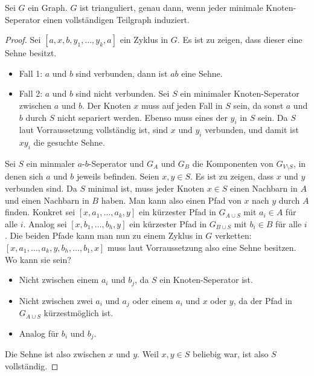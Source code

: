 \documentclass[../main.tex]{subfiles}
\begin{document}
\begin{satz}\label{thm:triangulated--completeSeperator}
    Sei $G$ ein Graph. $G$ ist trianguliert, genau dann, wenn jeder minimale Knoten-Seperator einen vollständigen Teilgraph induziert.
\end{satz}
\begin{proof}
    \say{$\Leftarrow$} Sei $[a, x, b, y_1, \hdots, y_k, a]$ ein Zyklus in $G$. Es ist zu zeigen, dass dieser eine Sehne besitzt.
    \begin{itemize}
        \item Fall 1: $a$ und $b$ sind verbunden, dann ist $ab$ eine Sehne.
        \item Fall 2: $a$ und $b$ sind nicht verbunden. Sei $S$ ein minimaler Knoten-Seperator zwischen $a$ und $b$. Der Knoten $x$ muss auf jeden Fall in $S$ sein, da sonst $a$ und $b$ durch $S$ nicht separiert werden. Ebenso muss eines der $y_i$ in $S$ sein. Da $S$ laut Vorraussetzung vollständig ist, sind $x$ und $y_i$ verbunden, und damit ist $xy_i$ die gesuchte Sehne.

    \end{itemize}

    \say{$\Rightarrow$} Sei $S$ ein minmaler $a$-$b$-Seperator und $G_A$ und $G_B$ die Komponenten von $G_{V \setminus S}$, in denen sich $a$ und $b$ jeweils befinden. Seien $x, y \in S$. Es ist zu zeigen, dass $x$ und $y$ verbunden sind. Da $S$ minimal ist, muss jeder Knoten $x \in S$ einen Nachbarn in $A$ und einen Nachbarn in $B$ haben. Man kann also einen Pfad von $x$ nach $y$ durch $A$ finden. Konkret sei $[x, a_1, \hdots, a_k, y]$ ein kürzester Pfad in $G_{A \cup S}$ mit $a_i \in A$ für alle $i$. Analog sei $[x, b_1, \hdots, b_h, y]$ ein kürzester Pfad in $G_{B \cup S}$ mit $b_i \in B$ für alle $i$. Die beiden Pfade kann man nun zu einem Zyklus in $G$ verketten: $[x, a_1, \hdots, a_k, y, b_h, \hdots, b_1, x]$ muss laut Vorraussetzung also eine Sehne besitzen. Wo kann sie sein?

    \begin{itemize}
        \item Nicht zwischen einem $a_i$ und $b_j$, da $S$ ein Knoten-Seperator ist.
        \item Nicht zwischen zwei $a_i$ und $a_j$ oder einem $a_i$ und $x$ oder $y$, da der Pfad in $G_{A \cup S}$ kürzestmöglich ist.
        \item Analog für $b_i$ und $b_j$.
    \end{itemize}

    Die Sehne ist also zwischen $x$ und $y$. Weil $x, y \in S$ beliebig war, ist also $S$ vollständig.
\end{proof}
        
\end{document}
